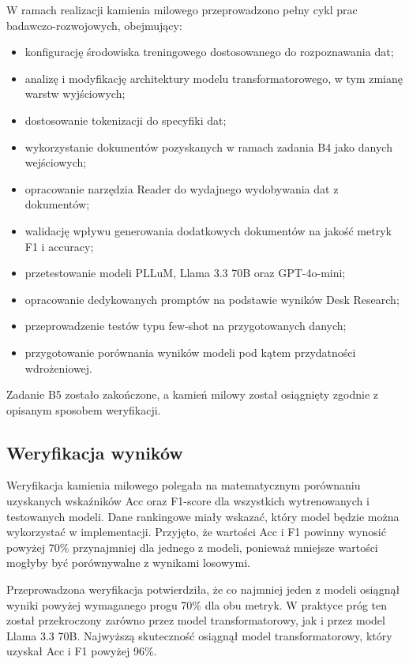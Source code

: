 \documentclass[12pt,a4paper]{report}
\begin{document}
W ramach realizacji kamienia milowego przeprowadzono pełny cykl prac badawczo-rozwojowych, obejmujący:

\begin{itemize}
    \item konfigurację środowiska treningowego dostosowanego do rozpoznawania dat;
    \item analizę i modyfikację architektury modelu transformatorowego, w tym zmianę warstw wyjściowych;
    \item dostosowanie tokenizacji do specyfiki dat;
    \item wykorzystanie dokumentów pozyskanych w ramach zadania B4 jako danych wejściowych;
    \item opracowanie narzędzia Reader do wydajnego wydobywania dat z dokumentów;
    \item walidację wpływu generowania dodatkowych dokumentów na jakość metryk F1 i accuracy;
    \item przetestowanie modeli PLLuM, Llama 3.3 70B oraz GPT-4o-mini;
    \item opracowanie dedykowanych promptów na podstawie wyników Desk Research;
    \item przeprowadzenie testów typu few-shot na przygotowanych danych;
    \item przygotowanie porównania wyników modeli pod kątem przydatności wdrożeniowej.
\end{itemize}

Zadanie B5 zostało zakończone, a kamień milowy został osiągnięty zgodnie z opisanym sposobem weryfikacji.

\subsection{Weryfikacja wyników}
Weryfikacja kamienia milowego polegała na matematycznym porównaniu uzyskanych wskaźników Acc oraz F1-score dla wszystkich wytrenowanych i testowanych modeli. Dane rankingowe miały wskazać, który model będzie można wykorzystać w implementacji. Przyjęto, że wartości Acc i F1 powinny wynosić powyżej 70\% przynajmniej dla jednego z modeli, ponieważ mniejsze wartości mogłyby być porównywalne z wynikami losowymi.

Przeprowadzona weryfikacja potwierdziła, że co najmniej jeden z modeli osiągnął wyniki powyżej wymaganego progu 70\% dla obu metryk. W praktyce próg ten został przekroczony zarówno przez model transformatorowy, jak i przez model Llama 3.3 70B. Najwyższą skuteczność osiągnął model transformatorowy, który uzyskał Acc i F1 powyżej 96\%.
\end{document}
